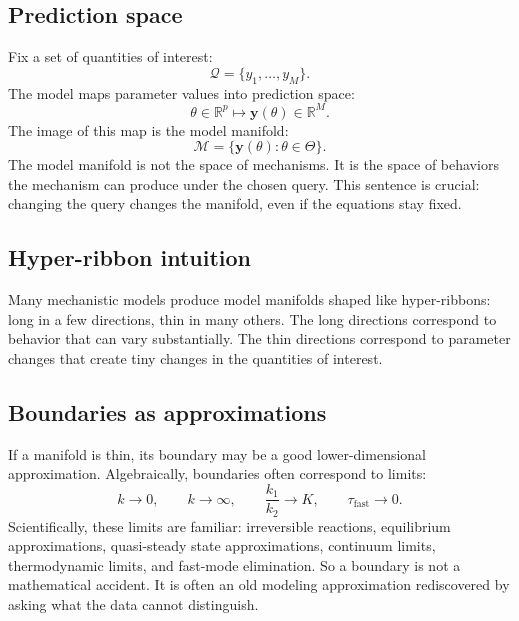 \documentclass[a4paper]{article}
\newcommand{\R}{\mathbb{R}}
\newcommand{\vect}[1]{\mathbf{#1}}
\newcommand{\param}{\theta}
\newcommand{\qoi}{\mathcal{Q}}
\newcommand{\manifold}{\mathcal{M}}
\begin{document}
\subsection{Prediction space}

Fix a set of quantities of interest:
\[
  \qoi=\{y_1,\ldots,y_M\}.
\]
The model maps parameter values into prediction space:
\[
  \param\in\R^p
  \longmapsto
  \vect{y}(\param)\in\R^M.
\]
The image of this map is the model manifold:
\[
  \manifold
  =
  \{\vect{y}(\param):\param\in\Theta\}.
\]
The model manifold is not the space of mechanisms.  It is the space of behaviors the mechanism can produce under the chosen query.  This sentence is crucial: changing the query changes the manifold, even if the equations stay fixed.

\subsection{Hyper-ribbon intuition}

Many mechanistic models produce model manifolds shaped like hyper-ribbons: long in a few directions, thin in many others.  The long directions correspond to behavior that can vary substantially.  The thin directions correspond to parameter changes that create tiny changes in the quantities of interest.

\begin{center}
\end{center}

\subsection{Boundaries as approximations}

If a manifold is thin, its boundary may be a good lower-dimensional approximation.  Algebraically, boundaries often correspond to limits:
\[
  k\to 0,\qquad
  k\to\infty,\qquad
  \frac{k_1}{k_2}\to K,\qquad
  \tau_{\mathrm{fast}}\to 0.
\]
Scientifically, these limits are familiar: irreversible reactions, equilibrium approximations, quasi-steady state approximations, continuum limits, thermodynamic limits, and fast-mode elimination.  So a boundary is not a mathematical accident.  It is often an old modeling approximation rediscovered by asking what the data cannot distinguish.
\end{document}
